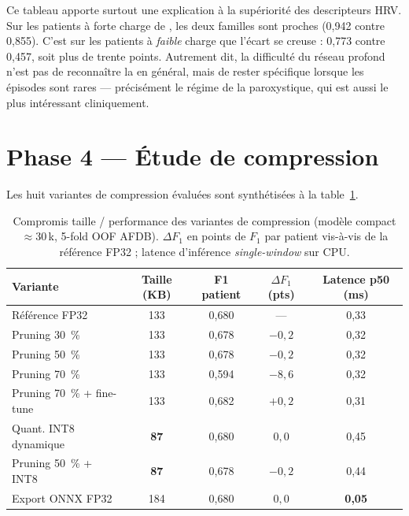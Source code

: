 Ce tableau apporte surtout une explication à la supériorité des descripteurs HRV. Sur les patients à forte charge de \FA{}, les deux familles sont proches (0,942 contre 0,855). C'est sur les patients à \emph{faible} charge que l'écart se creuse : 0,773 contre 0,457, soit plus de trente points. Autrement dit, la difficulté du réseau profond n'est pas de reconnaître la \FA{} en général, mais de rester spécifique lorsque les épisodes sont rares — précisément le régime de la \FA{} paroxystique, qui est aussi le plus intéressant cliniquement.

\section{Phase 4 — Étude de compression}
\label{sec:res:compression}

Les huit variantes de compression évaluées sont synthétisées à la table~\ref{tab:res:compression}.

\begin{table}[H]
  \centering
  \caption{Compromis taille / performance des variantes de compression (modèle compact \(\approx\)30\,k, 5-fold OOF AFDB). \(\Delta F_1\) en points de \(F_1\) par patient vis-à-vis de la référence FP32 ; latence d'inférence \textit{single-window} sur CPU.}
  \label{tab:res:compression}
  \begin{tabular}{lcccc}
    \toprule
    \textbf{Variante} & \textbf{Taille (KB)} & \textbf{F1 patient} & \(\Delta F_1\) (pts) & \textbf{Latence p50 (ms)} \\
    \midrule
    Référence FP32              & 133 & 0,680 & ---     & 0,33 \\
    Pruning 30~\%               & 133 & 0,678 & \(-0{,}2\) & 0,32 \\
    Pruning 50~\%               & 133 & 0,678 & \(-0{,}2\) & 0,32 \\
    Pruning 70~\%               & 133 & 0,594 & \(-8{,}6\) & 0,32 \\
    Pruning 70~\% + fine-tune   & 133 & 0,682 & \(+0{,}2\) & 0,31 \\
    Quant. INT8 dynamique       & \textbf{87} & 0,680 & \(0{,}0\) & 0,45 \\
    Pruning 50~\% + INT8        & \textbf{87} & 0,678 & \(-0{,}2\) & 0,44 \\
    Export ONNX FP32            & 184 & 0,680 & \(0{,}0\) & \textbf{0,05} \\
    \bottomrule
  \end{tabular}
\end{table}

